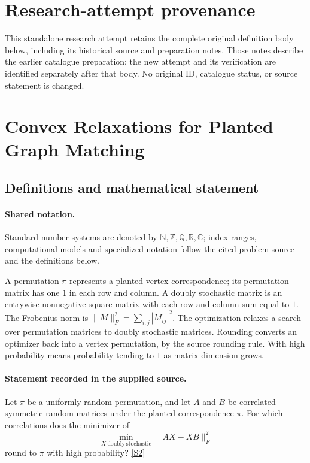 \documentclass[11pt]{article}
\begin{document}
\section*{Research-attempt provenance}
This standalone research attempt retains the complete original definition body below,
including its historical source and preparation notes. Those notes describe the
earlier catalogue preparation; the new attempt and its verification are identified
separately after that body. No original ID, catalogue status, or source statement is changed.

\section{Convex Relaxations for Planted Graph Matching}\label{statement}

\subsection{Definitions and mathematical statement}

\paragraph{Shared notation.}Standard number systems are denoted by $\mathbb N,\mathbb Z,\mathbb Q,\mathbb R,\mathbb C$; index ranges, computational models and specialized notation follow the cited problem source and the definitions below.


A permutation $\pi$ represents a planted vertex correspondence; its permutation matrix has one $1$ in each row and column. A doubly stochastic matrix is an entrywise nonnegative square matrix with each row and column sum equal to $1$. The Frobenius norm is $\lVert M\rVert_F^2=\sum_{i,j}|M_{ij}|^2$. The optimization relaxes a search over permutation matrices to doubly stochastic matrices. Rounding converts an optimizer back into a vertex permutation, by the source rounding rule. With high probability means probability tending to $1$ as matrix dimension grows.
\paragraph{Statement recorded in the supplied source.}
Let $\pi$ be a uniformly random permutation, and let $A$ and $B$ be correlated symmetric random matrices under the planted correspondence $\pi$. For which correlations does the minimizer of
$$
\min_{X\ \mathrm{doubly\ stochastic}}\|AX-XB\|_F^2
$$
round to $\pi$ with high probability? \href{https://doi.org/10.4171/owr/2022/14}{[S2]}
\end{document}
